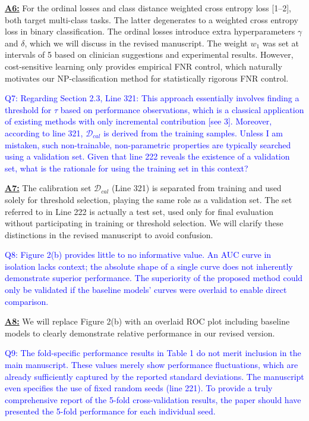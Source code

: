 \documentclass[UTF8,12pt]{article}
\begin{document}
\underline{{\bf A6:}} For the ordinal losses and class distance weighted cross entropy loss [1–2], both target multi-class tasks. The latter degenerates to a weighted cross entropy loss in binary classification. The ordinal losses introduce extra hyperparameters $\gamma$ and $\delta$, which we will discuss in the revised manuscript. The weight $w_{1}$ was set at intervals of 5 based on clinician suggestions and experimental results. However, cost-sensitive learning only provides empirical FNR control, which naturally motivates our NP-classification method for statistically rigorous FNR control.

\textcolor{blue}{Q7: Regarding Section 2.3, Line 321: This approach essentially involves finding a threshold for $\tau$ based on performance observations, which is a classical application of existing methods with only incremental contribution [see 3]. Moreover, according to line 321, $\mathcal{D}_{cal}$ is derived from the training samples. Unless I am mistaken, such non-trainable, non-parametric properties are typically searched using a validation set. Given that line 222 reveals the existence of a validation set, what is the rationale for using the training set in this context?}

\underline{{\bf A7:}} The calibration set \(\mathcal{D}_{cal}\) (Line 321) is separated from training and used solely for threshold selection, playing the same role as a validation set. The set referred to in Line 222 is actually a test set, used only for final evaluation without participating in training or threshold selection. We will clarify these distinctions in the revised manuscript to avoid confusion.

\textcolor{blue}{Q8: Figure 2(b) provides little to no informative value. An AUC curve in isolation lacks context; the absolute shape of a single curve does not inherently demonstrate superior performance. The superiority of the proposed method could only be validated if the baseline models' curves were overlaid to enable direct comparison.}

\underline{{\bf A8:}} We will replace Figure 2(b) with an overlaid ROC plot including baseline models to clearly demonstrate relative performance in our revised version.

\textcolor{blue}{Q9: The fold-specific performance results in Table 1 do not merit inclusion in the main manuscript. These values merely show performance fluctuations, which are already sufficiently captured by the reported standard deviations. The manuscript even specifies the use of fixed random seeds (line 221). To provide a truly comprehensive report of the 5-fold cross-validation results, the paper should have presented the 5-fold performance for each individual seed.}
\end{document}
